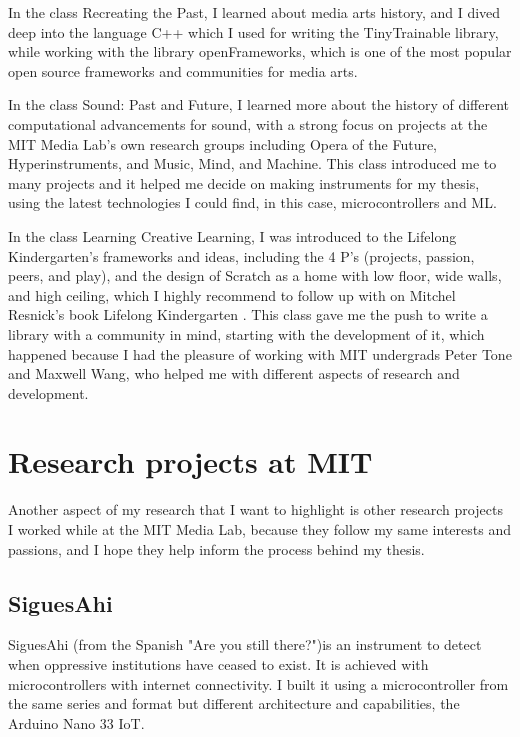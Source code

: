 In the class Recreating the Past, I learned about media arts history, and I dived deep into the language C++ which I used for writing the TinyTrainable library, while working with the library openFrameworks, which is one of the most popular open source frameworks and communities for media arts.

In the class Sound: Past and Future, I learned more about the history of different computational advancements for sound, with a strong focus on projects at the MIT Media Lab's own research groups including Opera of the Future, Hyperinstruments, and Music, Mind, and Machine. This class introduced me to many projects and it helped me decide on making instruments for my thesis, using the latest technologies I could find, in this case, microcontrollers and \acrshort{ML}.

In the class Learning Creative Learning, I was introduced to the Lifelong Kindergarten's frameworks and ideas, including the 4 P's (projects, passion, peers, and play), and the design of Scratch as a home with low floor, wide walls, and high ceiling, which I highly recommend to follow up with  on Mitchel Resnick's book Lifelong Kindergarten \cite{lifelong-kindergarten}. This class gave me the push to write a library with a community in mind, starting with the development of it, which happened because I had the pleasure of working with MIT undergrads Peter Tone and Maxwell Wang, who helped me with different aspects of research and development.

\section{Research projects at MIT}

Another aspect of my research that I want to highlight is other research projects I worked while at the MIT Media Lab, because they follow my same interests and passions, and I hope they help inform the process behind my thesis.

\subsection{SiguesAhi}

SiguesAhi \cite{website-library-siguesahi} (from the Spanish "Are you still there?")is an instrument to detect when oppressive institutions have ceased to exist. It is achieved with microcontrollers with internet connectivity.  I built it using a microcontroller from the same series and format but different architecture and capabilities, the Arduino Nano 33 IoT.

